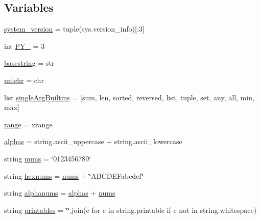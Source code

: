 \subsection*{Variables}
\begin{DoxyCompactItemize}
\item 
\hyperlink{namespacesetuptools_1_1__vendor_1_1pyparsing_a8b977e24358a5ef08f92f05e38096c3a}{system\+\_\+version} = tuple(sys.\+version\+\_\+info)\mbox{[}\+:3\mbox{]}
\item 
int \hyperlink{namespacesetuptools_1_1__vendor_1_1pyparsing_a8cdd27ad05a70b65fd950d07ed4cc0ee}{P\+Y\+\_} = 3
\item 
\hyperlink{namespacesetuptools_1_1__vendor_1_1pyparsing_ad5bad0275a1ebfc3be5ffcbaa8345c2b}{basestring} = str
\item 
\hyperlink{namespacesetuptools_1_1__vendor_1_1pyparsing_aebf7a8aa762f9aeaac4a0767516fc025}{unichr} = chr
\item 
list \hyperlink{namespacesetuptools_1_1__vendor_1_1pyparsing_a3eb714ee3e0c7a24710d5376c3cf85be}{single\+Arg\+Builtins} = \mbox{[}sum, len, sorted, reversed, list, tuple, set, any, all, min, max\mbox{]}
\item 
\hyperlink{namespacesetuptools_1_1__vendor_1_1pyparsing_a4a3e8a165b7a3aac7b6f83975ee1beac}{range} = xrange
\item 
\hyperlink{namespacesetuptools_1_1__vendor_1_1pyparsing_aa1e79ef7e5382a4dc4dcc6ce37ef91e9}{alphas} = string.\+ascii\+\_\+uppercase + string.\+ascii\+\_\+lowercase
\item 
string \hyperlink{namespacesetuptools_1_1__vendor_1_1pyparsing_a3f511d6c4190141f2a9105c67f3e1f27}{nums} = \char`\"{}0123456789\char`\"{}
\item 
string \hyperlink{namespacesetuptools_1_1__vendor_1_1pyparsing_a65efda8b212f9098d73df40df3ed0cc9}{hexnums} = \hyperlink{namespacesetuptools_1_1__vendor_1_1pyparsing_a3f511d6c4190141f2a9105c67f3e1f27}{nums} + \char`\"{}A\+B\+C\+D\+E\+Fabcdef\char`\"{}
\item 
string \hyperlink{namespacesetuptools_1_1__vendor_1_1pyparsing_a9441041befe04d1efb091151a019e0b4}{alphanums} = \hyperlink{namespacesetuptools_1_1__vendor_1_1pyparsing_aa1e79ef7e5382a4dc4dcc6ce37ef91e9}{alphas} + \hyperlink{namespacesetuptools_1_1__vendor_1_1pyparsing_a3f511d6c4190141f2a9105c67f3e1f27}{nums}
\item 
string \hyperlink{namespacesetuptools_1_1__vendor_1_1pyparsing_a2474cb1a45d2f854cc6a58ddb9ba59ec}{printables} = \char`\"{}\char`\"{}.join(c for c in string.\+printable if c not in string.\+whitespace)

\end{DoxyCompactItemize}
